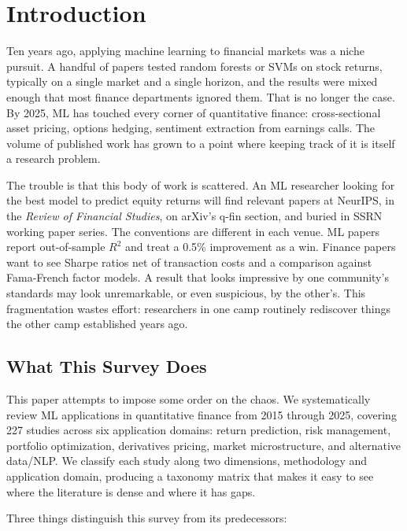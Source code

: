 \section{Introduction}\label{sec:introduction}

Ten years ago, applying machine learning to financial markets was a niche pursuit. A handful of papers tested random forests or SVMs on stock returns, typically on a single market and a single horizon, and the results were mixed enough that most finance departments ignored them. That is no longer the case. By 2025, ML has touched every corner of quantitative finance: cross-sectional asset pricing, options hedging, sentiment extraction from earnings calls. The volume of published work has grown to a point where keeping track of it is itself a research problem.

The trouble is that this body of work is scattered. An ML researcher looking for the best model to predict equity returns will find relevant papers at NeurIPS, in the \textit{Review of Financial Studies}, on arXiv's q-fin section, and buried in SSRN working paper series. The conventions are different in each venue. ML papers report out-of-sample $R^2$ and treat a 0.5\% improvement as a win. Finance papers want to see Sharpe ratios net of transaction costs and a comparison against Fama-French factor models. A result that looks impressive by one community's standards may look unremarkable, or even suspicious, by the other's. This fragmentation wastes effort: researchers in one camp routinely rediscover things the other camp established years ago.

\subsection{What This Survey Does}

This paper attempts to impose some order on the chaos. We systematically review ML applications in quantitative finance from 2015 through 2025, covering 227 studies across six application domains: return prediction, risk management, portfolio optimization, derivatives pricing, market microstructure, and alternative data/NLP. We classify each study along two dimensions, methodology and application domain, producing a taxonomy matrix that makes it easy to see where the literature is dense and where it has gaps.

Three things distinguish this survey from its predecessors:

